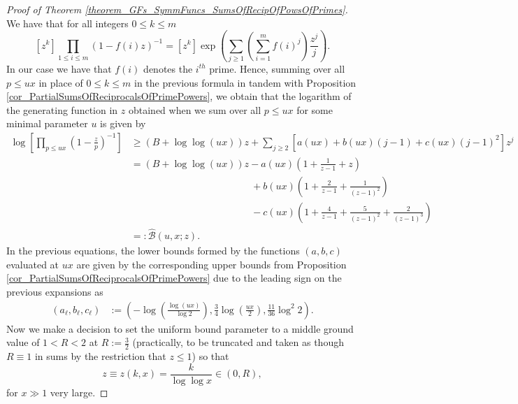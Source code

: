 \documentclass[11pt,reqno,a4letter]{article}
\numberwithin{figure}{section}
\numberwithin{table}{section}
\theoremstyle{plain}
\numberwithin{theorem}{section}
\theoremstyle{definition}
\newcommand{\NBRef}[1]{}
\begin{document}
\NBRef{A06-2020-04-26} 
\begin{proof}[Proof of Theorem \ref{theorem_GFs_SymmFuncs_SumsOfRecipOfPowsOfPrimes}] 
\label{proofOf_theorem_GFs_SymmFuncs_SumsOfRecipOfPowsOfPrimes} 
We have that for all integers $0 \leq k \leq m$
\begin{equation} 
\label{eqn_pf_tag_hSymmPolysGF} 
[z^k] \prod_{1 \leq i \leq m} (1-f(i) z)^{-1} = [z^k] \exp\left(\sum_{j \geq 1} 
     \left(\sum_{i=1}^m f(i)^j\right) \frac{z^j}{j}\right). 
\end{equation} 
In our case we have that $f(i)$ denotes the $i^{th}$ prime. 
Hence, summing over all $p \leq ux$ 
in place of $0 \leq k \leq m$ in the previous formula in tandem with 
Proposition \ref{cor_PartialSumsOfReciprocalsOfPrimePowers}, we obtain that the logarithm of the 
generating function in $z$ obtained when we sum over all $p \leq ux$ for some minimal parameter 
$u$ is given by 
\begin{align*} 
\log\left[\prod_{p \leq ux} \left(1-\frac{z}{p}\right)^{-1}\right] & \geq (B + \log\log (ux)) z + 
     \sum_{j \geq 2} \left[a(ux) + b(ux)(j-1) + c(ux) (j-1)^2\right] z^j \\ 
     & = (B + \log\log (ux)) z - a(ux) \left(1 + \frac{1}{z-1} + z\right) \\ 
     & \phantom{= (B + \log\log (ux)) z\ } + 
     b(ux) \left( 
     1 + \frac{2}{z-1} + \frac{1}{(z-1)^2}\right) \\ 
     & \phantom{= (B + \log\log (ux)) z\ } - 
     c(ux) \left( 
     1 + \frac{4}{z-1} + \frac{5}{(z-1)^2} + \frac{2}{(z-1)^3}\right) \\ 
     & =: \widehat{\mathcal{B}}(u, x; z). 
\end{align*} 
In the previous equations, the lower bounds formed by the functions $(a,b,c)$ 
evaluated at $ux$ are 
given by the corresponding upper bounds from 
Proposition \ref{cor_PartialSumsOfReciprocalsOfPrimePowers} 
due to the leading sign on the previous expansions as 
\begin{align*} 
(a_{\ell}, b_{\ell}, c_{\ell}) & := \left(-\log\left(\frac{\log (ux)}{\log 2}\right), 
     \frac{3}{4} \log\left(\frac{ux}{2}\right), \frac{11}{36} \log^2 2\right). 
\end{align*} 
Now we make a decision to set the uniform bound parameter to a middle ground value of 
$1 < R < 2$ at $R := \frac{3}{2}$ 
(practically, to be truncated and taken as though 
$R \equiv 1$ in sums by the restriction that $z \leq 1$) so that 
$$z \equiv z(k, x) = \frac{k}{\log\log x} \in (0, R),$$ for $x \gg 1$ very large. 

\end{proof}
\end{document}
